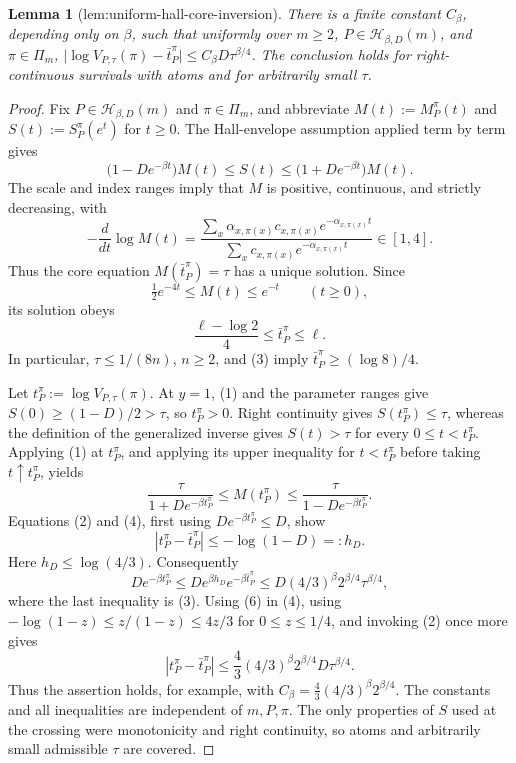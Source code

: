 \documentclass{article}
\newtheorem{lemma}{Lemma}
\begin{document}
\begin{lemma}[lem:uniform-hall-core-inversion]\label{lem:uniform-hall-core-inversion}
There is a finite constant \(C_{\beta}\), depending only on \(\beta\), such that uniformly over \(m\ge2\), \(P\in\mathcal H_{\beta,D}(m)\), and \(\pi\in\Pi_m\), \(\lvert\log V_{P,\tau}(\pi)-\bar t_P^{\pi}\rvert\le C_{\beta}D\tau^{\beta/4}\). The conclusion holds for right-continuous survivals with atoms and for arbitrarily small \(\tau\).
\end{lemma}
\begin{proof}
Fix \(P\in\mathcal H_{\beta,D}(m)\) and \(\pi\in\Pi_m\), and abbreviate \(M(t):=M_P^\pi(t)\) and \(S(t):=S_P^\pi(e^t)\) for \(t\geq0\).  The Hall-envelope assumption applied term by term gives
\[
\bigl(1-De^{-\beta t}\bigr)M(t)\leq S(t)\leq
\bigl(1+De^{-\beta t}\bigr)M(t).                                      \tag{1}
\]
The scale and index ranges imply that \(M\) is positive, continuous, and strictly decreasing, with
\[
-\frac{d}{dt}\log M(t)
=\frac{\sum_x\alpha_{x,\pi(x)}c_{x,\pi(x)}e^{-\alpha_{x,\pi(x)}t}}
{\sum_xc_{x,\pi(x)}e^{-\alpha_{x,\pi(x)}t}}
\in[1,4].                                                               \tag{2}
\]
Thus the core equation \(M(\bar t_P^\pi)=\tau\) has a unique solution.  Since
\[
\tfrac12 e^{-4t}\leq M(t)\leq e^{-t}\qquad(t\geq0),
\]
its solution obeys
\[
\frac{\ell-\log2}{4}\leq\bar t_P^\pi\leq\ell.                         \tag{3}
\]
In particular, \(\tau\leq1/(8n)\), \(n\geq2\), and (3) imply \(\bar t_P^\pi\geq(\log8)/4\).

Let \(t_P^\pi:=\log V_{P,\tau}(\pi)\).  At \(y=1\), (1) and the parameter ranges give \(S(0)\geq(1-D)/2>\tau\), so \(t_P^\pi>0\).  Right continuity gives \(S(t_P^\pi)\leq\tau\), whereas the definition of the generalized inverse gives \(S(t)>\tau\) for every \(0\leq t<t_P^\pi\).  Applying (1) at \(t_P^\pi\), and applying its upper inequality for \(t<t_P^\pi\) before taking \(t\uparrow t_P^\pi\), yields
\[
\frac{\tau}{1+De^{-\beta t_P^\pi}}
\leq M(t_P^\pi)
\leq\frac{\tau}{1-De^{-\beta t_P^\pi}}.                                \tag{4}
\]
Equations (2) and (4), first using \(De^{-\beta t_P^\pi}\leq D\), show
\[
|t_P^\pi-\bar t_P^\pi|\leq -\log(1-D)=:h_D.                             \tag{5}
\]
Here \(h_D\leq\log(4/3)\).  Consequently
\[
De^{-\beta t_P^\pi}
\leq D e^{\beta h_D}e^{-\beta\bar t_P^\pi}
\leq D(4/3)^\beta 2^{\beta/4}\tau^{\beta/4},                           \tag{6}
\]
where the last inequality is (3).  Using (6) in (4), using \(-\log(1-z)\leq z/(1-z)\leq4z/3\) for \(0\leq z\leq1/4\), and invoking (2) once more gives
\[
|t_P^\pi-\bar t_P^\pi|
\leq \frac43(4/3)^\beta2^{\beta/4}D\tau^{\beta/4}.
\]
Thus the assertion holds, for example, with \(C_\beta=\frac43(4/3)^\beta2^{\beta/4}\).  The constants and all inequalities are independent of \(m,P,\pi\).  The only properties of \(S\) used at the crossing were monotonicity and right continuity, so atoms and arbitrarily small admissible \(\tau\) are covered.
\end{proof}
\end{document}
